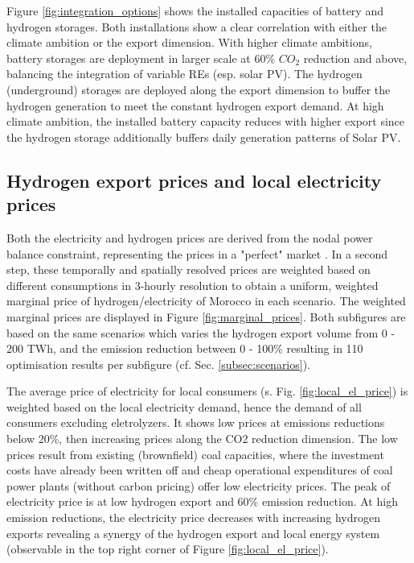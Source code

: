 Figure \ref{fig:integration_options} shows the installed capacities of battery and hydrogen storages. Both installations show a clear correlation with either the climate ambition or the export dimension. With higher climate ambitions, battery storages are deployment in larger scale at 60\% $CO_2$ reduction and above, balancing the integration of variable REs (esp. solar PV). The hydrogen (underground) storages are deployed along the export dimension to buffer the hydrogen generation to meet the constant hydrogen export demand. At high climate ambition, the installed battery capacity reduces with higher export since the hydrogen storage additionally buffers daily generation patterns of Solar PV.

\subsection{Hydrogen export prices and local electricity prices}
\label{subsec:results_prices}
Both the electricity and hydrogen prices are derived from the nodal power balance constraint, representing the prices in a "perfect" market \cite{Zeyen2022}.
In a second step, these temporally and spatially resolved prices are weighted based on different consumptions in 3-hourly resolution to obtain a uniform, weighted marginal price of hydrogen/electricity of Morocco in each scenario. The weighted marginal prices are displayed in Figure \ref{fig:marginal_prices}. Both subfigures are based on the same scenarios which varies the hydrogen export volume from 0 - 200 TWh, and the emission reduction between 0 - 100\% resulting in 110 optimisation results per subfigure (cf. Sec. \ref{subsec:scenarios}).

The average price of electricity for local consumers (s. Fig. \ref{fig:local_el_price}) is weighted based on the local electricity demand, hence the demand of all consumers excluding eletrolyzers. It shows low prices at emissions reductions below 20\%, then increasing prices along the CO2 reduction dimension. The low prices result from existing (brownfield) coal capacities, where the investment costs have already been written off and cheap operational expenditures of coal power plants (without carbon pricing) offer low electricity prices. The peak of electricity price is at low hydrogen export and 60\% emission reduction. At high emission reductions, the electricity price decreases with increasing hydrogen exports revealing a synergy of the hydrogen export and local energy system (observable in the top right corner of Figure \ref{fig:local_el_price}).

